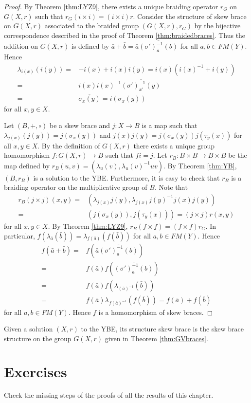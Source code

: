 \begin{proof}
By Theorem \ref{thm:LYZ9}, there exists a unique braiding operator $r_G$ on $G(X,r)$ such that $r_G(i\times i)=(i\times i)r$. Consider the structure of skew brace on $G(X,r)$ associated to the braided group $(G(X,r),r_G)$ by the bijective correspondence described in the proof of Theorem \ref{thm:braidedbraces}. Thus the addition on $G(X,r)$ is defined by $\bar a+\bar b=\bar a\overline{(\sigma')^{-1}_a(b)}$ for all $a,b\in FM(Y)$. Hence
\begin{align*}\lambda_{i(x)}(i(y))=&-i(x)+i(x)i(y)=i(x)(i(x)^{-1}+i(y))\\
=&i(x)i(x)^{-1}\overline{(\sigma')^{-1}_{x'}(y)}\\
=&\overline{\sigma_x(y)}=i(\sigma_x(y))
\end{align*}
for all $x,y\in X$.

Let $(B,+,\circ)$ be a skew brace and $j\colon X\rightarrow B$ is a map such that $\lambda_{j(x)}(j(y))=j(\sigma_x(y))$ and $j(x)j(y)=j(\sigma_x(y))j(\tau_y(x))$ for all $x,y\in X$. By the definition of $G(X,r)$ there exists a unique group homomorphism $f\colon G(X,r)\rightarrow B$ such that $fi=j$. Let $r_B\colon B\times B\rightarrow B\times B$ be the map defined by $r_B(u,v)=(\lambda_u(v),\lambda_u(v)^{-1}uv)$. By Theorem \ref{thm:YB}, $(B,r_B)$ is a solution to the YBE. Furthermore, it is easy to check that $r_B$ is a braiding operator on the multiplicative group of $B$. Note that
\begin{align*} r_B(j\times j)(x,y)=&(\lambda_{j(x)}j(y),\lambda_{j(x)}j(y)^{-1}j(x)j(y))\\
=&(j(\sigma_x(y)),j(\tau_y(x)))=(j\times j)r(x,y)
\end{align*}
for all $x,y\in X$. By Theorem \ref{thm:LYZ9}, $r_B(f\times f)=(f\times f)r_G$. In particular, $f\left(\lambda_{\bar a}(\bar b)\right)=\lambda_{f(\bar a)}(f(\bar b))$ for all $a,b\in FM(Y)$. Hence
\begin{align*}f(\bar a+\bar b)=& f\left(\bar a\overline{(\sigma')^{-1}_a(b)}\right)\\
=&f(\bar a)f\left(\overline{(\sigma')^{-1}_a(b)}\right)\\
=&f(\bar a)f\left(\lambda_{(\bar a)^{-1}}(\bar b)\right)\\
=&f(\bar a)\lambda_{f(\bar a)^{-1}}(f(\bar b))=f(\bar a)+f(\bar b)
\end{align*}
for all $a,b\in FM(Y)$. Hence $f$ is a homomorphism of skew braces.
\end{proof}

\begin{definition}
Given a solution $(X,r)$ to the YBE, its structure skew brace is the skew brace structure on the group $G(X,r)$ given in Theorem \ref{thm:GVbraces}.
\end{definition}

\section*{Exercises}

\begin{prob}
Check the missing steps of the proofs of all the results of this chapter. 
\end{prob}

